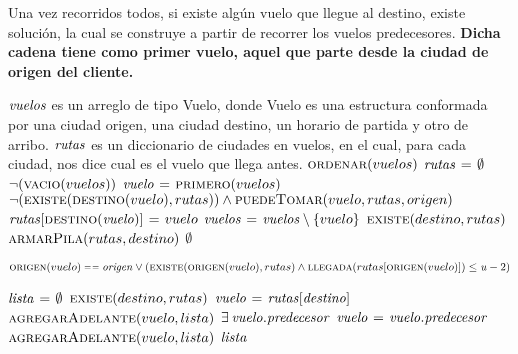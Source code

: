 Una vez recorridos todos, si existe algún vuelo que llegue al destino, existe 
solución, la cual se construye a partir de recorrer los vuelos predecesores.
\textbf{Dicha cadena tiene como primer vuelo, aquel que parte desde la ciudad 
de origen del cliente.}


\begin{codebox}
\li \Comment $\id{vuelos}$ es un arreglo de tipo Vuelo, donde Vuelo es una 
\li \Comment estructura conformada por una ciudad origen, una ciudad destino, 
\li \Comment un horario de partida y otro de arribo.
\li
\li \Comment $\id{rutas}$ es un diccionario de ciudades en vuelos, en el cual, 
\li \Comment para cada ciudad, nos dice cual es el vuelo que llega antes.
\li $\textnormal{\scshape ordenar}(vuelos)$
\li $\id{rutas} \gets \emptyset$
\li \While $\neg (\textnormal{\scshape vacio}(vuelos))$ 
\li     \Do
            $\id{vuelo} \gets \proc{primero}(vuelos)$
\li         \If $\neg (\textnormal{\scshape existe}(\textnormal{\scshape destino}(vuelo),rutas)) \land
                \textnormal{\scshape puedeTomar}(vuelo,rutas,origen)$ 
\li             \Then
                    $\id{rutas[\proc{destino}(vuelo)]} \gets vuelo$
                \End
\li         $\id{vuelos} \gets \id{vuelos} \setminus \{vuelo\}$
        \End
\li \If $\textnormal{\scshape existe}(destino,rutas)$ 
\li     \Then
            \Return $\textnormal{\scshape armarPila}(rutas,destino)$
\li     \Else
\li         \Return $\emptyset$
        \End
\end{codebox}


\vspace*{0.3cm}


\begin{codebox}
\li \Return $\proc{origen}(vuelo) \isequal \id{origen} \lor
            (\proc{existe}(\proc{origen}(vuelo),rutas) \land
             \proc{llegada}(rutas[\proc{origen}(vuelo)]) \leq
             \id{u} - 2)$
\end{codebox}


\vspace*{0.3cm}


\begin{codebox}
\li $\id{lista} \gets \emptyset$
\li \If $\textnormal{\scshape existe}(destino,rutas)$
\li     \Then
            $\id{vuelo} \gets \id{rutas[destino]}$
\li         $\textnormal{\scshape agregarAdelante}(vuelo,lista)$
\li         \While $\exists \hspace{0.07cm} \id{vuelo.predecesor}$ 
\li             \Do
                   $\id{vuelo} \gets \id{vuelo.predecesor}$  
\li                $\textnormal{\scshape agregarAdelante}(vuelo,lista)$  
                \End
\li     \Else
\li         \Return $\id{lista}$
        \End
\end{codebox}



